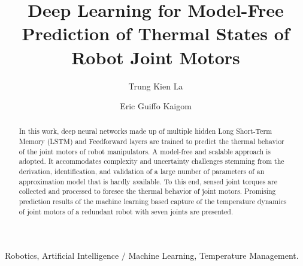 \documentclass{ifacconf}
\begin{document}
\begin{frontmatter}

\title{Deep Learning for Model-Free Prediction of  Thermal States of Robot Joint Motors} 


\author[First]{Trung Kien La} 
\author[First]{Eric Guiffo Kaigom} 

\address[First]{Department of Computer Science \& Engineering,
Frankfurt University of Applied Sciences, 60318 Frankfurt am Main, Germany (e-mails: trung.la@stud.fra-uas.de; kaigom@fb2.fra-uas.de).}

\begin{abstract}                %
	In this work, deep neural networks made up of multiple hidden Long Short-Term Memory (LSTM) and Feedforward  layers are trained to predict the  thermal behavior of the joint motors of robot manipulators. A model-free and scalable approach  is adopted. It accommodates   complexity and uncertainty challenges stemming from the derivation, identification, and validation of a large number of  parameters of an approximation model that is hardly available. To this end, sensed joint torques are  collected  and processed  to foresee the thermal behavior of joint motors. Promising prediction results of the machine learning based capture of the temperature dynamics of joint motors of a redundant robot with seven joints are presented. 
\end{abstract}

\begin{keyword}
Robotics, Artificial Intelligence $\slash$  Machine Learning, Temperature Management.
\end{keyword}

\end{frontmatter}
\end{document}
